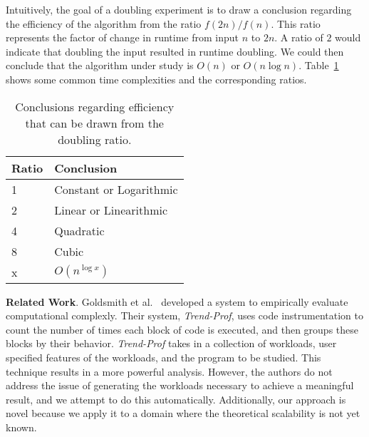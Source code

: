 Intuitively, the goal of a doubling experiment is to draw a conclusion regarding the efficiency of the algorithm from
the ratio $f(2n)/f(n)$. This ratio represents the factor of change in runtime from input $n$ to $2n$. A ratio of $2$
would indicate that doubling the input resulted in runtime doubling. We could then conclude that the algorithm under
study is $O(n)$ or $O(n\log n)$.  Table~\ref{table:ratios} shows some common time complexities and the corresponding
ratios.

\begin{table}[h]
\begin{tabular}{l|l}
Ratio & Conclusion              \\ \hline
1     & Constant or Logarithmic \\
2     & Linear or Linearithmic  \\
4     & Quadratic               \\
8     & Cubic                   \\
x     & $O(n^{\log x})$
\end{tabular}
\label{table:ratios}
\caption{Conclusions regarding efficiency that can be drawn from the
doubling ratio.}
\end{table}


{\bf Related Work}. Goldsmith et al.~\cite{Goldsmith2007} developed a system to empirically evaluate computational
complexly.  Their system, \textit{Trend-Prof}, uses code instrumentation to count the number of times each block of code
is executed, and then groups these blocks by their behavior.  \textit{Trend-Prof} takes in a collection of workloads,
user specified features of the workloads, and the program to be studied. This technique results in a more powerful
analysis. However, the authors do not address the issue of generating the workloads necessary to achieve a meaningful
result, and we attempt to do this automatically.  Additionally, our approach is novel because we apply it to a domain
where the theoretical scalability is not yet known.
